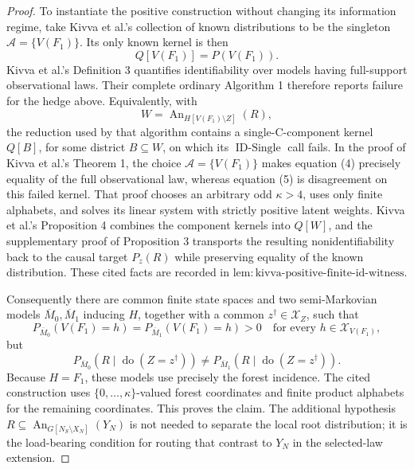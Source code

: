 \documentclass{article}
\begin{document}
\begin{proof}
To instantiate the positive construction without changing its information regime, take Kivva et al.'s collection of known distributions to be the singleton \(\mathcal A=\{V(F_1)\}\). Its only known kernel is then
\[
 Q[V(F_1)]=P(V(F_1)).
\]
Kivva et al.'s Definition 3 quantifies identifiability over models having full-support observational laws. Their complete ordinary Algorithm 1 therefore reports failure for the hedge above. Equivalently, with
\[
 W=\operatorname{An}_{H[V(F_1)\setminus Z]}(R),
\]
the reduction used by that algorithm contains a single-C-component kernel \(Q[B]\), for some district \(B\subseteq W\), on which its \(\operatorname{ID\text{-}Single}\) call fails. In the proof of Kivva et al.'s Theorem 1, the choice \(\mathcal A=\{V(F_1)\}\) makes equation (4) precisely equality of the full observational law, whereas equation (5) is disagreement on this failed kernel. That proof chooses an arbitrary odd \(\kappa>4\), uses only finite alphabets, and solves its linear system with strictly positive latent weights. Kivva et al.'s Proposition 4 combines the component kernels into \(Q[W]\), and the supplementary proof of Proposition 3 transports the resulting nonidentifiability back to the causal target \(P_z(R)\) while preserving equality of the known distribution. These cited facts are recorded in \(\mathrm{lem:kivva\text{-}positive\text{-}finite\text{-}id\text{-}witness}\).

Consequently there are common finite state spaces and two semi-Markovian models \(\overline M_0,\overline M_1\) inducing \(H\), together with a common \(z^\dagger\in\mathcal X_Z\), such that
\[
 P_{\overline M_0}(V(F_1)=h)
 =P_{\overline M_1}(V(F_1)=h)>0
 \quad\text{for every }h\in\mathcal X_{V(F_1)},
\]
but
\[
 P_{\overline M_0}(R\mid\operatorname{do}(Z=z^\dagger))
 \ne
 P_{\overline M_1}(R\mid\operatorname{do}(Z=z^\dagger)).
\]
Because \(H=F_1\), these models use precisely the forest incidence. The cited construction uses \(\{0,\ldots,\kappa\}\)-valued forest coordinates and finite product alphabets for the remaining coordinates. This proves the claim. The additional hypothesis \(R\subseteq\operatorname{An}_{G[N_S\setminus X_N]}(Y_N)\) is not needed to separate the local root distribution; it is the load-bearing condition for routing that contrast to \(Y_N\) in the selected-law extension.


\end{proof}
\end{document}
